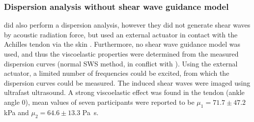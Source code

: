 \subsubsection{Dispersion analysis without shear wave guidance model}
\citeauthor{cortes_continuous_2015} did also perform a dispersion analysis, however they did not generate shear waves by acoustic radiation force, but used an external actuator in contact with the Achilles tendon via the skin \cite{cortes_continuous_2015}. Furthermore, no shear wave guidance model was used, and thus the viscoelastic properties were determined from the measured dispersion curves (normal SWS method, in conflict with \cite{brum_vivo_2014, helfenstein-didier_vivo_2016}). Using the external actuator, a limited number of frequencies could be excited, from which the dispersion curves could be measured. The induced shear waves were imaged using ultrafast ultrasound. A strong viscoelastic effect was found in the tendon (ankle angle \SI{0}{\deg}), mean values of seven participants were reported to be $\mu_1 = 71.7 \pm 47.2$ \si{\kilo\pascal} and $\mu_2 = 64.6 \pm 13.3$ \si{\pascal\second}. 






	
	





